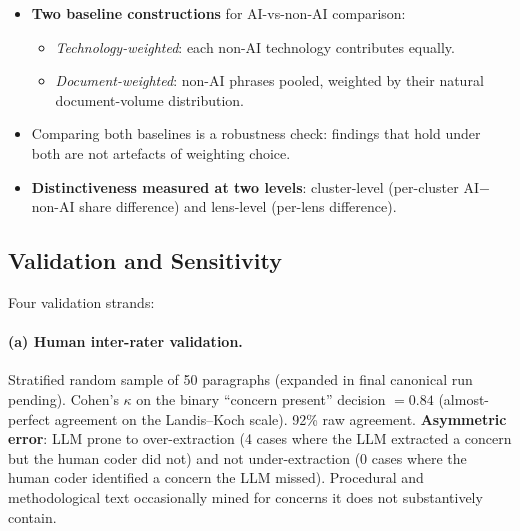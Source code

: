 \documentclass[11pt, a4paper]{article}
\begin{document}
\begin{itemize}
\item \textbf{Two baseline constructions} for AI-vs-non-AI comparison:
      \begin{itemize}
      \item \emph{Technology-weighted}: each non-AI technology contributes
            equally.
      \item \emph{Document-weighted}: non-AI phrases pooled, weighted by
            their natural document-volume distribution.
      \end{itemize}
\item Comparing both baselines is a robustness check: findings that hold
      under both are not artefacts of weighting choice.
\item \textbf{Distinctiveness measured at two levels}: cluster-level
      (per-cluster AI$-$non-AI share difference) and lens-level
      (per-lens difference).
\end{itemize}

\subsection{Validation and Sensitivity}
\label{sec:validation}

Four validation strands:

\paragraph{(a) Human inter-rater validation.}  Stratified random sample
of 50 paragraphs (expanded in final canonical run pending).  Cohen's
$\kappa$ on the binary ``concern present'' decision $= 0.84$
(almost-perfect agreement on the Landis--Koch scale).  92\% raw
agreement.  \textbf{Asymmetric error}: LLM prone to over-extraction (4
cases where the LLM extracted a concern but the human coder did not) and
not under-extraction (0 cases where the human coder identified a concern
the LLM missed).  Procedural and methodological text occasionally mined
for concerns it does not substantively contain.
\end{document}
